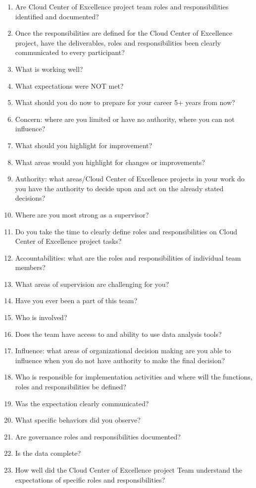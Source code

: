 \documentclass[10pt,letterpaper]{article}
\begin{document}
\begingroup\small\begin{enumerate}[leftmargin=2.1em, itemsep=4pt]
\item[1.] Are Cloud Center of Excellence project team roles and responsibilities identified and documented?
\item[2.] Once the responsibilities are defined for the Cloud Center of Excellence project, have the deliverables, roles and responsibilities been clearly communicated to every participant?
\item[3.] What is working well?
\item[4.] What expectations were NOT met?
\item[5.] What should you do now to prepare for your career 5+ years from now?
\item[6.] Concern: where are you limited or have no authority, where you can not influence?
\item[7.] What should you highlight for improvement?
\item[8.] What areas would you highlight for changes or improvements?
\item[9.] Authority: what areas/Cloud Center of Excellence projects in your work do you have the authority to decide upon and act on the already stated decisions?
\item[10.] Where are you most strong as a supervisor?
\item[11.] Do you take the time to clearly define roles and responsibilities on Cloud Center of Excellence project tasks?
\item[12.] Accountabilities: what are the roles and responsibilities of individual team members?
\item[13.] What areas of supervision are challenging for you?
\item[14.] Have you ever been a part of this team?
\item[15.] Who is involved?
\item[16.] Does the team have access to and ability to use data analysis tools?
\item[17.] Influence: what areas of organizational decision making are you able to influence when you do not have authority to make the final decision?
\item[18.] Who is responsible for implementation activities and where will the functions, roles and responsibilities be defined?
\item[19.] Was the expectation clearly communicated?
\item[20.] What specific behaviors did you observe?
\item[21.] Are governance roles and responsibilities documented?
\item[22.] Is the data complete?
\item[23.] How well did the Cloud Center of Excellence project Team understand the expectations of specific roles and responsibilities?
\end{enumerate}\endgroup
\end{document}
